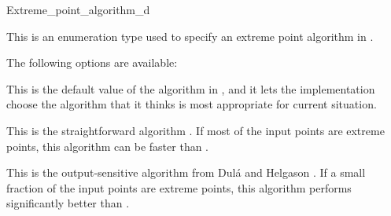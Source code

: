 \begin{ccRefEnum}{Extreme_point_algorithm_d}



{
This is an enumeration type used to specify an extreme point algorithm in .
}

The following options are available:

This is the default value of the algorithm in , and it lets the implementation choose the algorithm that it thinks is most appropriate for current situation.

This is the straightforward algorithm . If most of the input points are extreme points, this algorithm can be faster than .

This is the output-sensitive algorithm from Dul\'a and Helgason \cite{cgal:dh-pifch-96} . If a small fraction of the input points are extreme points, this algorithm performs significantly better than .

\ccSeeAlso



\end{ccRefEnum}
